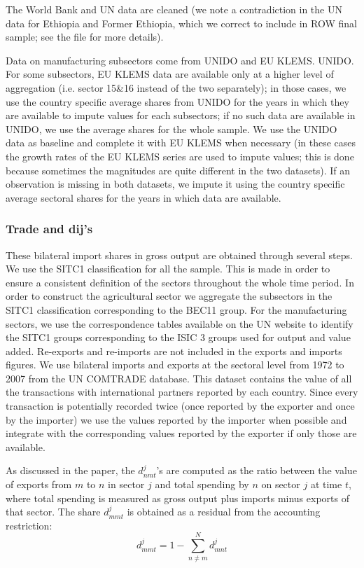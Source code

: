 \documentclass[12pt]{article}
\begin{document}
The World Bank and UN data are cleaned (we note a contradiction in the UN
data for Ethiopia and Former Ethiopia, which we correct to include in ROW
final sample; see the file for more details).

Data on manufacturing subsectors come from UNIDO and EU KLEMS. UNIDO. For
some subsectors, EU KLEMS data are available only at a higher level of
aggregation (i.e. sector 15\&16 instead of the two separately); in those
cases, we use the country specific average shares from UNIDO for the years
in which they are available to impute values for each subsectors; if no such
data are available in UNIDO, we use the average shares for the whole sample.
We use the UNIDO data as baseline and complete it with EU KLEMS when
necessary (in these cases the growth rates of the EU KLEMS series are used
to impute values; this is done because sometimes the magnitudes are quite
different in the two datasets). If an observation is missing in both
datasets, we impute it using the country specific average sectoral shares
for the years in which data are available.

\subsubsection{ Trade and dij's}

These bilateral import shares in gross output are obtained through several
steps. We use the SITC1 classification for all the sample. This is made in
order to ensure a consistent definition of the sectors throughout the whole
time period. In order to construct the agricultural sector we aggregate the
subsectors in the SITC1 classification corresponding to the BEC11 group. For
the manufacturing sectors, we use the correspondence tables available on the
UN website to identify the SITC1 groups corresponding to the ISIC 3 groups
used for output and value added. Re-exports and re-imports are not included
in the exports and imports figures. We use bilateral imports and exports at
the sectoral level from 1972 to 2007 from the UN COMTRADE database. This
dataset contains the value of all the transactions with international
partners reported by each country. Since every transaction is potentially
recorded twice (once reported by the exporter and once by the importer) we
use the values reported by the importer when possible and integrate with the
corresponding values reported by the exporter if only those are available.

As discussed in the paper, the $d_{nmt}^{j}$'s are computed as the ratio
between the value of exports from $m$ to $n$ in sector $j$ and total
spending by $n$ on sector $j$ at time $t$, where total spending is measured
as gross output plus imports minus exports of that sector. The share $%
d_{mmt}^{j}$ is obtained as a residual from the accounting restriction: 
\begin{equation*}
d_{mmt}^{j}=1-\sum\limits_{n\neq m}^{N}d_{mnt}^{j}
\end{equation*}
\end{document}
